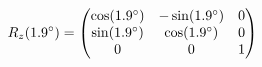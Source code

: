 \documentclass[preview]{standalone}
\begin{document}
\begin{align*}
\special{dvisvgm:raw <g id='unique000'>}R_z(1.9^\circ) = \begin{pmatrix} \cos(1.9^\circ) & -\sin(1.9^\circ) & 0 \\ \sin(1.9^\circ) & \cos(1.9^\circ) & 0 \\ 0 & 0 & 1 \end{pmatrix}\special{dvisvgm:raw </g>}
\end{align*}
\end{document}
